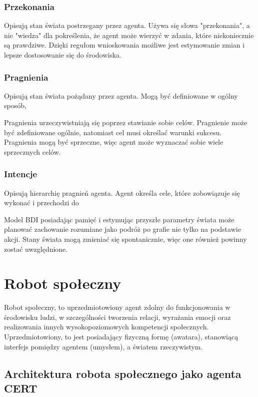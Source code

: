\subsubsection{Przekonania}
Opisują stan świata postrzegany przez agenta. Używa się słowa "przekonania", a nie "wiedza" dla pokreślenia, że agent może wierzyć w zdania, które niekoniecznie są prawdziwe. Dzięki regułom wnioskowania możliwe jest estymowanie zmian i lepsze dostosowanie się do środowiska. 

\subsubsection{Pragnienia}
Opisują stan świata pożądany przez agenta. Mogą być definiowane w ogólny sposób, 

Pragnienia urzeczywistniają się poprzez stawianie sobie celów. Pragnienie może być zdefiniowane ogólnie, natomiast cel musi określać warunki sukcesu. Pragnienia mogą być sprzeczne, więc agent może wyznaczać sobie wiele sprzecznych celów. 

\subsubsection{Intencje}
Opisują hierarchię pragnień agenta. Agent określa cele, które zobowiązuje się wykonać i przechodzi do 


Model BDI posiadając pamięć i estymując przyszłe parametry świata może planować zachowanie rozumiane jako podróż po grafie nie tylko na podstawie akcji. Stany świata mogą zmieniać się spontanicznie, więc one również powinny zostać uwzględnione. 

\section{Robot społeczny}
Robot społeczny, to uprzedmiotowiony agent zdolny do funkcjonowania w środowisku ludzi, w szczególności tworzenia relacji, wyrażania emocji oraz realizowania innych wysokopoziomowych kompetencji społecznych. Uprzedmiotowiony, to jest posiadający fizyczną formę (awatara), stanowiącą interfejs pomiędzy agentem (umysłem), a światem rzeczywistym. 

\subsection{Architektura robota społecznego jako agenta CERT}

